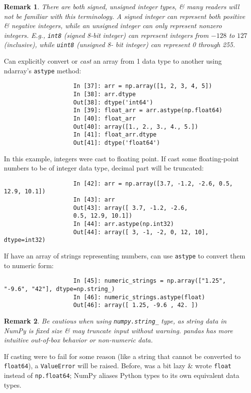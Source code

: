 \documentclass{article}
\newtheorem{remark}{Remark}
\begin{document}
\begin{enumerate}
\begin{itemize}
\begin{itemize}
\begin{itemize}
				\begin{remark}
					There are both \emph{signed, unsigned} integer types, \& many readers will not be familiar with this terminology. A \emph{signed} integer can represent both positive \& negative integers, while an \emph{unsigned} integer can only represent nonzero integers. E.g., {\tt int8} (signed 8-bit integer) can represent integers from $-128$ to $127$ (inclusive), while {\tt uint8} (unsigned 8- bit integer) can represent  0 through 255.
				\end{remark}
				Can explicitly convert or {\it cast} an array from 1 data type to another using ndarray's {\tt astype} method:
				\begin{verbatim}
					In [37]: arr = np.array([1, 2, 3, 4, 5])
					In [38]: arr.dtype
					Out[38]: dtype('int64')
					In [39]: float_arr = arr.astype(np.float64)
					In [40]: float_arr
					Out[40]: array([1., 2., 3., 4., 5.])
					In [41]: float_arr.dtype
					Out[41]: dtype('float64')
				\end{verbatim}
				In this example, integers were cast to floating point. If cast some floating-point numbers to be of integer data type, decimal part will be truncated:
				\begin{verbatim}
					In [42]: arr = np.array([3.7, -1.2, -2.6, 0.5, 12.9, 10.1])
					In [43]: arr
					Out[43]: array([ 3.7, -1.2, -2.6,
					0.5, 12.9, 10.1])
					In [44]: arr.astype(np.int32)
					Out[44]: array([ 3, -1, -2, 0, 12, 10], dtype=int32)
				\end{verbatim}
				If have an array of strings representing numbers, can use {\tt astype} to convert them to numeric form:
				\begin{verbatim}
					In [45]: numeric_strings = np.array(["1.25", "-9.6", "42"], dtype=np.string_)
					In [46]: numeric_strings.astype(float)
					Out[46]: array([ 1.25, -9.6 , 42. ])
				\end{verbatim}
				
				\begin{remark}
					Be cautious when using \verb|numpy.string_| type, as string data in NumPy is fixed size \& may truncate input without warning. pandas has more intuitive out-of-box behavior or non-numeric data.
				\end{remark}
				If casting were to fail for some reason (like a string that cannot be converted to {\tt float64}), a {\tt ValueError} will be raised. Before, was a bit lazy \& wrote {\tt float} instead of {\tt np.float64}; NumPy aliases Python types to its own equivalent data types.
				

\end{itemize}
\end{itemize}
\end{itemize}
\end{enumerate}
\end{document}
